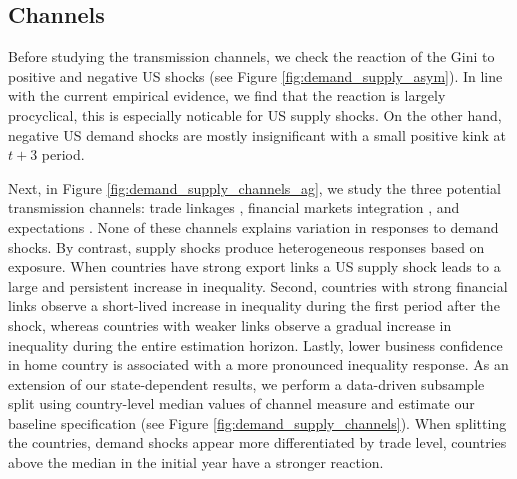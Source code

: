 \documentclass[12pt, a4paper]{article}
\begin{document}
\subsection{Channels}
Before studying the transmission channels, we check the reaction of the Gini to positive and negative US shocks (see Figure \ref{fig:demand_supply_asym}). In line with the current empirical evidence, we find that the reaction is largely procyclical, this is especially noticable for US supply shocks. On the other hand, negative US demand shocks are mostly insignificant with a small positive kink at $t+3$ period.

Next, in Figure \ref{fig:demand_supply_channels_ag}, we study the three potential transmission channels: trade linkages \parencite{corsetti2011multilateral}, financial markets integration \parencite{faccini2016international}, and expectations \parencite{klein2021real}. None of these channels explains variation in responses to demand shocks. By contrast, supply shocks produce heterogeneous responses based on exposure. When countries have strong export links a US supply shock leads to a large and persistent increase in inequality. Second, countries with strong financial links observe a short-lived increase in inequality during the first period after the shock, whereas countries with weaker links observe a gradual increase in inequality during the entire estimation horizon. Lastly, lower business confidence in home country is associated with a more pronounced inequality response. As an extension of our state-dependent results, we perform a data-driven subsample split using country-level median values of channel measure and estimate our baseline specification (see Figure \ref{fig:demand_supply_channels}). When splitting the countries, demand shocks appear more differentiated by trade level, countries above the median in the initial year have a stronger reaction. 


\end{document}
